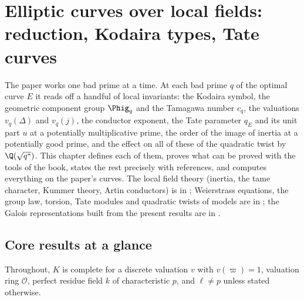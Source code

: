 \chapter{Elliptic curves over local fields: reduction, Kodaira types, Tate curves}\label{ch:reduction}

The paper works one bad prime at a time. At each bad prime $q$ of the optimal curve $E$ it reads off a handful of local
invariants: the Kodaira symbol, the geometric component group $\Phig_q$ and the Tamagawa number $c_q$, the valuations
$v_q(\Delta)$ and $v_q(j)$, the conductor exponent, the Tate parameter $q_E$ and its unit part $u$ at a potentially
multiplicative prime, the order of the image of inertia at a potentially good prime, and the effect on all of these of the
quadratic twist by $\Q(\sqrt{q^*})$. This chapter defines each of them, proves what can be proved with the tools of the
book, states the rest precisely with references, and computes everything on the paper's curves. The local field theory
(inertia, the tame character, Kummer theory, Artin conductors) is in ; Weierstrass equations, the group law,
torsion, Tate modules and quadratic twists of models are in ; the Galois representations built from the
present results are in .

\section*{Core results at a glance}

Throughout, $K$ is complete for a discrete valuation $v$ with $v(\varpi)=1$, valuation ring $\mathcal O$, perfect residue field
$k$ of characteristic $p$, and $\ell\ne p$ unless stated otherwise.

